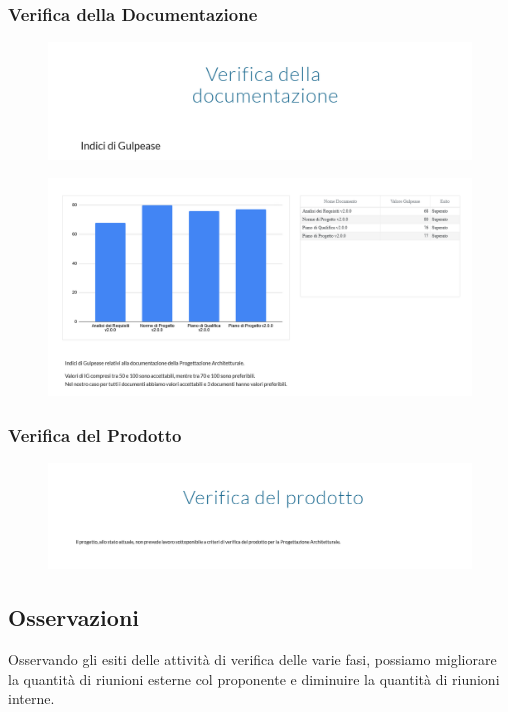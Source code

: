 \subsubsection{Verifica della Documentazione}
\begin{figure}[H]
	\includegraphics[scale=0.5]{res/images/cruscotto/pa_8.png}
\end{figure}
\begin{figure}[H]
	\includegraphics[scale=0.5]{res/images/cruscotto/pa_9.png}
\end{figure}
\subsubsection{Verifica del Prodotto}
\begin{figure}[H]
	\includegraphics[scale=0.5]{res/images/cruscotto/pa_10.png}
\end{figure}
\pagebreak
\subsection{Osservazioni}
Osservando gli esiti delle attività di verifica delle varie fasi, possiamo migliorare la quantità di riunioni esterne col proponente e diminuire la quantità di riunioni interne.
